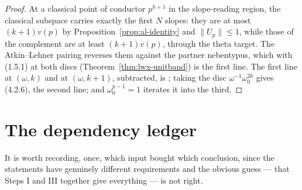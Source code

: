 \begin{proof}
  \leanok
  At a classical point of conductor $p^{h+1}$ in the slope-reading region, the classical subspace
  carries exactly the first $N$ slopes: they are at most $(k+1)v(p)$ by
  Proposition~\ref{prop:al-identity} and $\lVert U_p\rVert \leq 1$, while those of the complement
  are at least $(k+1)v(p)$, through the theta target.  The Atkin--Lehner pairing reverses them
  against the partner nebentypus, which with (1.5.1) at both discs
  (Theorem~\ref{thm:lwx-unitband}) is the first line.  The first line at $(\omega,k)$ and at
  $(\omega,k+1)$, subtracted, is \cite[(4.2.5)]{LWX}; taking the disc $\omega^{-1}\omega_0^{2k}$
  gives (4.2.6), the second line; and $\omega_0^{p-1} = 1$ iterates it into the third.
\end{proof}

\section{The dependency ledger}
\label{sec:ledger}

It is worth recording, once, which input bought which conclusion, since the statements have
genuinely different requirements and the obvious guess --- that Steps I and III together give
everything --- is not right.

